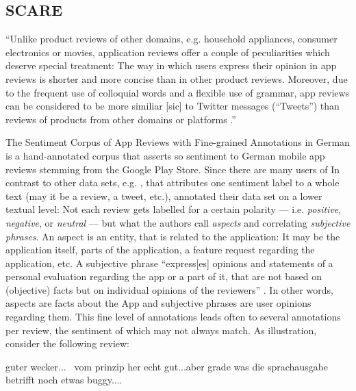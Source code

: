 \subsection{SCARE}


``Unlike product reviews of other domains, e.g. household appliances, consumer electronics or
movies, application reviews offer a couple of peculiarities which deserve special treatment:
The way in which users express their opinion in app reviews is shorter and more concise than in
other product reviews.
Moreover, due to the frequent use of colloquial words and a flexible use of grammar, app reviews
can be considered to be more similiar [sic] to Twitter messages (“Tweets”) than reviews of
products from other domains or platforms \textelp{}.'' \citep[p.~1114]{sanger2016scare}


The Sentiment Corpus of App Reviews with Fine-grained Annotations in German \cite{sanger2016scare}
is a hand-annotated corpus that asserts so sentiment to German mobile app reviews stemming from
the Google Play Store.
Since there are many users of
In contrast to other data sets, e.g. \citep{socher2013recursive, go2009twitter}, that attributes
one sentiment label to a whole text (may it be a review, a tweet, etc.), \cite{sanger2016scare}
annotated their data set on a lower textual level:
Not each review gets labelled for a certain polarity --- i.e. \emph{positive}, \emph{negative}, or
\emph{neutral} --- but what the authors call \emph{aspects} and correlating \emph{subjective
phrases}.
An aspect is an entity, that is related to the application:
It may be the application itself, parts of the application, a feature request regarding the
application, etc.
A subjective phrase ``express[es] opinions and statements of a personal evaluation regarding the
app or a part of it, that are not based on (objective) facts but on individual opinions of the
reviewers'' \citep[p.~1116]{sanger2016scare}.
In other words, aspects are facts about the App and subjective phrases are user opinions regarding
them.
This fine level of annotations leads often to several annotations per review, the sentiment of
which may not always match.
As illustration, consider the following review:

\begin{examples}
  \label{ex:fine-grained-anno}
  \item guter wecker... \textbar\textbar\ vom prinzip her echt gut...aber grade was die sprachausgabe betrifft noch etwas buggy....
\end{examples}

